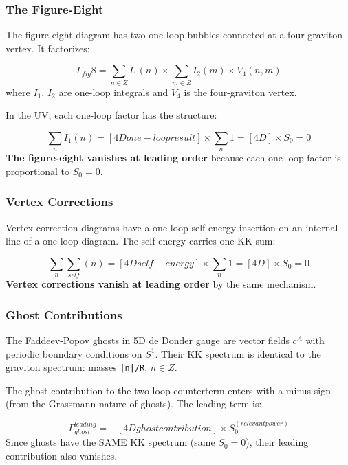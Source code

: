 \documentclass[aps,prd,preprint,superscriptaddress,longbibliography,floatfix]{revtex4-2}
\theoremstyle{remark}
\begin{document}
\subsubsection{The Figure-Eight}

The figure-eight diagram has two one-loop bubbles connected at a four-graviton vertex. It factorizes:


\begin{equation}
    \Gamma_{fig}8 = \sum_{n \in Z} I_{1}(n) \times \sum_{m \in Z} I_{2}(m) \times V_{4}(n, m)
\end{equation}
where $I_{1}$, $I_{2}$ are one-loop integrals and $V_{4}$ is the four-graviton vertex.

In the UV, each one-loop factor has the structure:


\begin{equation}
    \sum_n I_{1}(n) = [4D one-loop result] \times \sum_n 1 = [4D] \times S_{0} = 0
\end{equation}
\textbf{The figure-eight vanishes at leading order} because each one-loop factor is proportional to $S_{0} = 0$.


\subsubsection{Vertex Corrections}

Vertex correction diagrams have a one-loop self-energy insertion on an internal line of a one-loop diagram. The self-energy carries one KK sum:


\begin{equation}
    \sum_n \sum_{self}(n) = [4D self-energy] \times \sum_n 1 = [4D] \times S_{0} = 0
\end{equation}
\textbf{Vertex corrections vanish at leading order} by the same mechanism.


\subsubsection{Ghost Contributions}

The Faddeev-Popov ghosts in 5D de Donder gauge are vector fields $c^A$ with periodic boundary conditions on $S^{1}$. Their KK spectrum is identical to the graviton spectrum: masses \texttt{|n|/R}, $n \in Z$.

The ghost contribution to the two-loop counterterm enters with a minus sign (from the Grassmann nature of ghosts). The leading term is:


\begin{equation}
    \Gamma_{ghost}^{leading} = -[4D ghost contribution] \times S_{0}^{(relevant power)}
\end{equation}
Since ghosts have the SAME KK spectrum (same $S_{0} = 0$), their leading contribution also vanishes.
\end{document}

